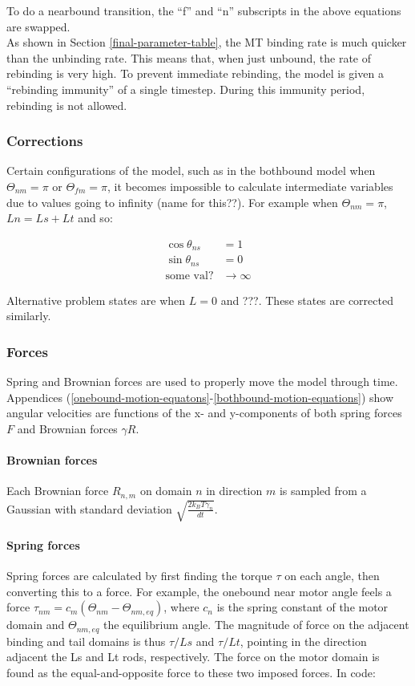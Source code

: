 \documentclass[10pt]{article} %
\begin{document}
To do a nearbound transition, the ``f'' and ``n'' subscripts in the above equations are swapped.\\

As shown in Section \ref{final-parameter-table}, the MT binding rate is much quicker than the unbinding rate. This means that, when just unbound, the rate of rebinding is very high. To prevent immediate rebinding, the model is given a ``rebinding immunity'' of a single timestep. During this immunity period, rebinding is not allowed.\\

\subsubsection{Corrections}
\label{corrections-section}
Certain configurations of the model, such as in the bothbound model when $\Theta_{nm} = \pi$ or $\Theta_{fm} = \pi$, it becomes impossible to calculate intermediate variables due to values going to infinity (name for this??). For example when $\Theta_{nm} = \pi$, $Ln = Ls + Lt$ and so:

\begin{align}
  \cos\theta_{ns} &= 1 \\
  \sin\theta_{ns} &= 0 \\
  \mbox{some val?} &\rightarrow \infty
\end{align}

Alternative problem states are when $L = 0$ and ???. These states are corrected similarly.\\

\subsubsection{Forces}
Spring and Brownian forces are used to properly move the model through time. Appendices (\ref{onebound-motion-equatons}-\ref{bothbound-motion-equations}) show angular velocities are functions of the x- and y-components of both spring forces $F$ and Brownian forces $\gamma R$.

\paragraph{Brownian forces}
Each Brownian force $R_{n,m}$ on domain $n$ in direction $m$ is sampled from a Gaussian with standard deviation $\sqrt{\frac{2k_BT\gamma_n}{dt}}$.\\

\paragraph{Spring forces}
Spring forces are calculated by first finding the torque $\tau$ on each angle, then converting this to a force. For example, the onebound near motor angle feels a force $\tau_{nm} = c_m(\Theta_{nm}-\Theta_{nm,eq})$, where $c_n$ is the spring constant of the motor domain and $\Theta_{nm,eq}$ the equilibrium angle. The magnitude of force on the adjacent binding and tail domains is thus $\tau/Ls$ and $\tau/Lt$, pointing in the direction adjacent the Ls and Lt rods, respectively. The force on the motor domain is found as the equal-and-opposite force to these two imposed forces. In code:
\end{document}
